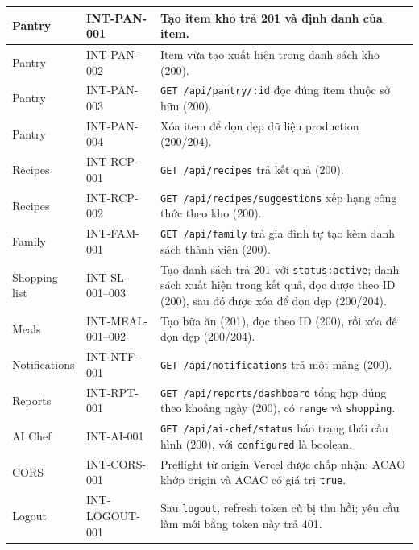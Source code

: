 \documentclass[12pt,a4paper]{article}
\newcommand{\code}[1]{\texttt{#1}}
\begin{document}
\begin{table}[p]
\begin{tabularx}{\linewidth}{
|>{\raggedright\arraybackslash}p{2.0cm}
|>{\raggedright\arraybackslash}p{2.35cm}
|Y|
}
Pantry
&
INT-PAN-001
&
Tạo item kho trả 201 và định danh của item.
\\
\hline

Pantry
&
INT-PAN-002
&
Item vừa tạo xuất hiện trong danh sách kho (200).
\\
\hline

Pantry
&
INT-PAN-003
&
\code{GET /api/pantry/:id} đọc đúng item thuộc sở hữu (200).
\\
\hline

Pantry
&
INT-PAN-004
&
Xóa item để dọn dẹp dữ liệu production (200/204).
\\
\hline

Recipes
&
INT-RCP-001
&
\code{GET /api/recipes} trả kết quả (200).
\\
\hline

Recipes
&
INT-RCP-002
&
\code{GET /api/recipes/suggestions} xếp hạng công thức theo kho
(200).
\\
\hline

Family
&
INT-FAM-001
&
\code{GET /api/family} trả gia đình tự tạo kèm danh sách thành viên
(200).
\\
\hline

Shopping list
&
INT-SL-001--003
&
Tạo danh sách trả 201 với \code{status:active}; danh sách xuất hiện
trong kết quả, đọc được theo ID (200), sau đó được xóa để dọn dẹp
(200/204).
\\
\hline

Meals
&
INT-MEAL-001--002
&
Tạo bữa ăn (201), đọc theo ID (200), rồi xóa để dọn dẹp (200/204).
\\
\hline

Notifications
&
INT-NTF-001
&
\code{GET /api/notifications} trả một mảng (200).
\\
\hline

Reports
&
INT-RPT-001
&
\code{GET /api/reports/dashboard} tổng hợp đúng theo khoảng ngày
(200), có \code{range} và \code{shopping}.
\\
\hline

AI Chef
&
INT-AI-001
&
\code{GET /api/ai-chef/status} báo trạng thái cấu hình (200), với
\code{configured} là boolean.
\\
\hline

CORS
&
INT-CORS-001
&
Preflight từ origin Vercel được chấp nhận: ACAO khớp origin và ACAC
có giá trị \code{true}.
\\
\hline

Logout
&
INT-LOGOUT-001
&
Sau \code{logout}, refresh token cũ bị thu hồi; yêu cầu làm mới bằng
token này trả 401.
\\
\hline

\end{tabularx}
\end{table}
\end{document}
